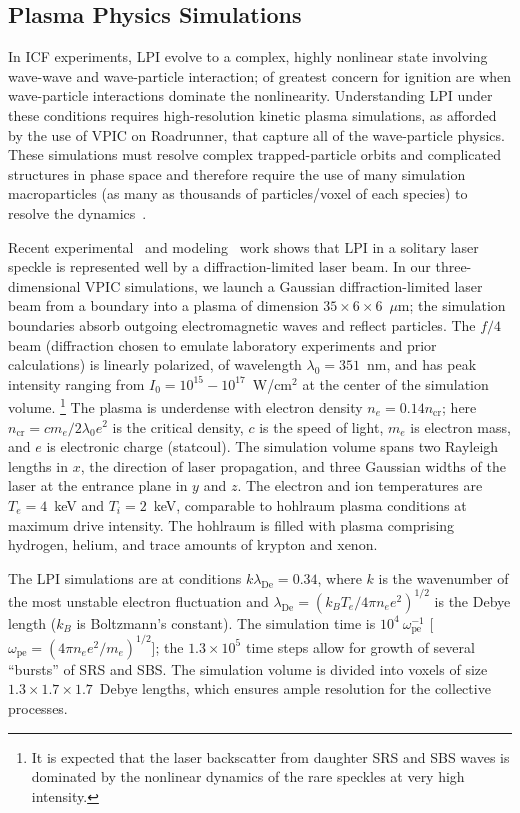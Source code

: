 \documentclass[journal,twoside]{IEEEtran}
\newcommand{\lde}      {\lambda_{\mathrm{De}}}
\newcommand{\wpe}      {\omega_{\mathrm{pe}}}
\begin{document}
\subsection{Plasma Physics Simulations}

In ICF experiments, LPI evolve to a complex, highly nonlinear state
involving wave-wave and wave-particle interaction; of greatest concern
for ignition are when wave-particle interactions dominate the
nonlinearity.  Understanding LPI under these conditions requires
high-resolution kinetic plasma simulations, as afforded by the use of
VPIC on Roadrunner, that capture all of the wave-particle physics.
These simulations must resolve complex trapped-particle orbits and
complicated structures in phase space and therefore require the use of
many simulation macroparticles (as many as thousands of
particles/voxel of each species) to resolve the
dynamics~\cite{Yin_et_al_Phys_Plasmas_2006}.

Recent experimental~\cite{Kline_PRL_2005} and
modeling~\cite{Yin_et_al_PRL_2007_SRS} work shows that LPI in a
solitary laser speckle is represented well by a diffraction-limited
laser beam.  In our three-dimensional VPIC simulations, we launch a
Gaussian diffraction-limited laser beam from a boundary into a plasma
of dimension $35 \times 6 \times 6$~$\mu$m; the simulation boundaries
absorb outgoing electromagnetic waves and reflect particles.  The
$f/4$ beam (diffraction chosen to emulate laboratory experiments and
prior calculations) is linearly polarized, of wavelength $\lambda_0 =
351$~nm, and has peak intensity ranging from $I_0 = 10^{15} -
10^{17}$~W/cm$^2$ at the center of the simulation volume.
\footnote{
It is expected that the laser backscatter from daughter SRS and SBS
waves is dominated by the nonlinear dynamics of the rare speckles at
very high intensity.}
The plasma is underdense with electron density $n_e = 0.14
n_{\mathrm{cr}}$; here $n_{\mathrm{cr}} = c m_e / 2 \lambda_0 e^2$ is
the critical density, $c$ is the speed of light, $m_e$ is electron
mass, and $e$ is electronic charge (statcoul).  The simulation volume
spans two Rayleigh lengths in $x$, the direction of laser propagation,
and three Gaussian widths of the laser at the entrance plane in $y$
and $z$.  The electron and ion temperatures are $T_e = 4$~keV and $T_i
= 2$~keV, comparable to hohlraum plasma conditions at maximum drive
intensity.  The hohlraum is filled with plasma comprising hydrogen,
helium, and trace amounts of krypton and xenon.

The LPI simulations are at conditions $k \lde = 0.34$, where $k$ is
the wavenumber of the most unstable electron fluctuation and $\lde =
(k_B T_e / 4 \pi n_e e^2)^{1/2}$ is the Debye length ($k_B$ is
Boltzmann's constant).  The simulation time is $10^4~\wpe^{-1}$ [$\wpe
= (4 \pi n_e e^2 / m_e)^{1/2}$]; the $1.3 \times 10^5$ time steps
allow for growth of several ``bursts'' of SRS and SBS.  The simulation
volume is divided into voxels of size $1.3 \times 1.7 \times
1.7$~Debye lengths, which ensures ample resolution for the collective
processes.
\end{document}
